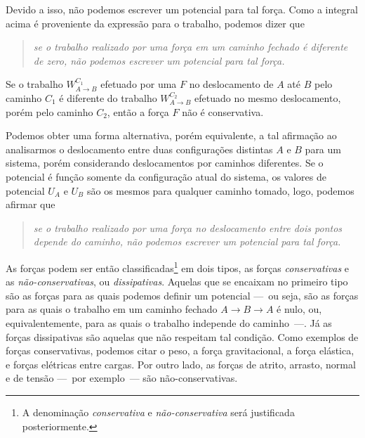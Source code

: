 \noindent{}Devido a isso, não podemos escrever um potencial para tal força. Como a integral acima é proveniente da expressão para o trabalho, podemos dizer que
\begin{quote}
\emph{se o trabalho realizado por uma força em um caminho fechado é diferente de zero, não podemos escrever um potencial para tal força.}
\end{quote}

\begin{marginfigure}
\centering
{}
\caption{Se o trabalho $W_{A\to B}^{C_1}$ efetuado por uma $F$ no deslocamento de $A$ até $B$ pelo caminho $C_1$ é diferente do trabalho $W_{A\to B}^{C_2}$ efetuado no mesmo deslocamento, porém pelo caminho $C_2$, então a força $F$ não é conservativa.}
\end{marginfigure}

Podemos obter uma forma alternativa, porém equivalente, a tal afirmação ao analisarmos o deslocamento entre duas configurações distintas $A$ e $B$ para um sistema, porém considerando deslocamentos por caminhos diferentes. Se o potencial é função somente da configuração atual do sistema, os valores de potencial $U_A$ e $U_B$ são os mesmos para qualquer caminho tomado, logo, podemos afirmar que
\begin{quote}
\emph{se o trabalho realizado por uma força no deslocamento entre dois pontos depende do caminho, não podemos escrever um potencial para tal força.}
\end{quote}

As forças podem ser então classificadas\footnote{A denominação \emph{conservativa} e \emph{não-conservativa} será justificada posteriormente.} em dois tipos, as forças \emph{conservativas} e as \emph{não-conservativas}, ou \emph{dissipativas}. Aquelas que se encaixam no primeiro tipo são as forças para as quais podemos definir um potencial ---~ou seja, são as forças para as quais o trabalho em um caminho fechado $A\to B\to A$ é nulo, ou, equivalentemente, para as quais o trabalho independe do caminho~---. Já as forças dissipativas são aquelas que não respeitam tal condição. Como exemplos de forças conservativas, podemos citar o peso, a força gravitacional, a força elástica, e forças elétricas entre cargas. Por outro lado, as forças de atrito, arrasto, normal e de tensão ---~por exemplo~--- são não-conservativas.

